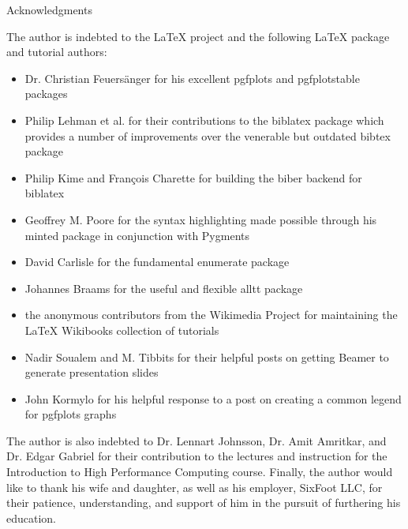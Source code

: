 \documentclass{article}
\begin{document}
  \begin{section}{Acknowledgments}
    \begin{paragraph}{}
      The author is indebted to the {\LaTeX} project\autocite{latexusrguide} and the following {\LaTeX} package and tutorial authors:
      \begin{itemize}
      \item{Dr. Christian Feuersänger for his excellent pgfplots\autocite{PgfplotsManual} and pgfplotstable\autocite{PgfplotstableManual} packages}
      \item{Philip Lehman et al. for their contributions to the biblatex\autocite{BiblatexManual} package which provides a number of improvements over the venerable
        but outdated bibtex\autocites{UsingBibTex,BibTexFormat} package}
      \item{Philip Kime and François Charette for building the biber \autocite{BiberManual} backend for biblatex}
      \item{Geoffrey M. Poore for the syntax highlighting made possible through his minted\autocite{MintedManual} package in conjunction with Pygments}
      \item{David Carlisle for the fundamental enumerate\autocite{LaTeXEnumerate} package}
      \item{Johannes Braams for the useful and flexible alltt\autocite{alltt} package}
      \item{the anonymous contributors from the Wikimedia Project for maintaining the {\LaTeX} Wikibooks collection of tutorials\autocites{latexmathematics,latexliststructures,latexheaders,WikiBeamer}}
      \item{Nadir Soualem and M. Tibbits for their helpful posts on getting Beamer to generate presentation slides\autocites{IntroToBeamer,BeamerSplitBiblio}}
      \item{John Kormylo for his helpful response to a post on creating a common legend for pgfplots graphs\autocite{GroupLegend}}
      \end{itemize}
      The author is also indebted to Dr. Lennart Johnsson, Dr. Amit Amritkar, and Dr. Edgar Gabriel for their contribution to the lectures and instruction for the
      Introduction to High Performance Computing course.
      Finally, the author would like to thank his wife and daughter, as well as his employer, SixFoot LLC, for their patience, understanding, and support
      of him in the pursuit of furthering his education.
    \end{paragraph}
  \end{section}
\end{document}
